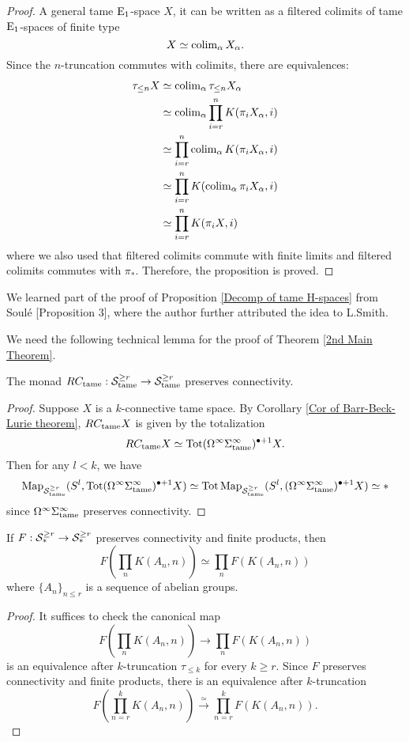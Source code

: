 \begin{proof}
A general tame $\operatorname{E}_1$-space $X$, it can be written as a filtered colimits of tame $\operatorname{E}_1$-spaces of finite type
$$
X\simeq \operatorname{colim}_{\alpha} X_{\alpha}.
$$
Since the $n$-truncation commutes with colimits, there are equivalences:
\begin{align*}
 \tau_{\leq n} X & \simeq \operatorname{colim}_{\alpha} \tau_{\leq n} X_{\alpha}\\
 & \simeq \operatorname{colim}_{\alpha} \prod^{n}_{i=r}K(\pi_iX_{\alpha} , i)\\
 & \simeq \prod^{n}_{i=r} \operatorname{colim}_{\alpha}K(\pi_{i}X_{\alpha},i)\\
 & \simeq \prod^{n}_{i=r} K(\operatorname{colim}_{\alpha}\pi_{i}X_{\alpha},i)\\
 & \simeq \prod^{n}_{i=r} K(\pi_{i}X,i)\\
\end{align*}
where we also used that filtered colimits commute with finite limits and filtered colimits commutes with $\pi_*$.
Therefore, the proposition is proved.
\end{proof}
\begin{remark}
		We learned part of the proof of Proposition \ref{Decomp of tame H-spaces} from Soul\'e \cite{soule}[Proposition 3], where the author further attributed the idea to L.Smith.	 
\end{remark}

We need the following technical lemma for the proof of Theorem \ref{2nd Main Theorem}.
\begin{lemma}
\label{RC_tame preserves connectivity}
The monad $RC_{\operatorname{\operatorname{tame}}}: {\mathcal{S}}^{\geq r}_{\operatorname{\operatorname{tame}}} \to 
{\mathcal{S}}^{\geq r}_{\operatorname{\operatorname{tame}}}$ preserves connectivity.
\end{lemma}
\begin{proof}
Suppose $X$ is a $k$-connective tame space.
By Corollary \ref{Cor of Barr-Beck-Lurie theorem}, 
$RC_{\operatorname{\operatorname{tame}}} X$ is given by the totalization 
$$
RC_{\operatorname{\operatorname{tame}}} X \simeq \operatorname{\operatorname{Tot}} (\Omega^{\infty} \Sigma^{\infty}_{\operatorname{\operatorname{tame}}})^{\bullet +1}  X.
$$
Then for any $l<k$, we have
$$
\operatorname{Map}_{{\mathcal{S}}^{\geq r}_{\operatorname{\operatorname{tame}}}}(S^l, \operatorname{\operatorname{Tot}} (\Omega^{\infty} \Sigma^{\infty}_{\operatorname{\operatorname{tame}}})^{\bullet +1}  X) \simeq 
\operatorname{\operatorname{Tot}} \operatorname{Map}_{{\mathcal{S}}^{\geq r}_{\operatorname{\operatorname{tame}}}}(S^l,  (\Omega^{\infty} \Sigma^{\infty}_{\operatorname{\operatorname{tame}}})^{\bullet +1}  X) \simeq *
$$
since $\Omega^{\infty}\Sigma^{\infty}_{\operatorname{\operatorname{tame}}}$ preserves connectivity.

\end{proof}

\begin{lemma}
\label{RV commutes infinite products of EM-spaces}
If $F:{\mathcal{S}}^{\geq r}_* \to {\mathcal{S}}^{\geq r}_*$ preserves connectivity and finite products, then 
$$
F(\prod_n K(A_n, n)) \simeq \prod_n F(K(A_n, n))
$$
where $\{A_n\}_{n\leq r}$ is a sequence of abelian groups.
\end{lemma}
\begin{proof}
It suffices to check the canonical map 
$$
F(\prod_n K(A_n, n)) \to \prod_n F(K(A_n, n))
$$ 
is an equivalence after $k$-truncation $\tau_{\leq k}$ for every $k\geq r$. Since $F$ preserves connectivity and finite products, there is an equivalence after $k$-truncation
$$
F(\prod_{n=r}^{k} K(A_n, n)) \xrightarrow{\simeq} \prod_{n=r}^{k}F( K(A_n,n)).
$$
\end{proof}

